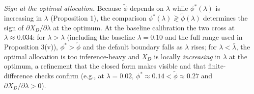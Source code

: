 \documentclass[
  11pt,
  letterpaper,
]{scrartcl}
\begin{document}
\emph{Sign at the optimal allocation.} Because \(\tilde{\phi}\) depends
on \(\lambda\) while \(\phi^*(\lambda)\) is increasing in \(\lambda\)
(Proposition 1), the comparison
\(\phi^*(\lambda) \gtrless \tilde{\phi}(\lambda)\) determines the sign
of \(\partial X_D/\partial \lambda\) at the optimum. At the baseline
calibration the two cross at \(\bar{\lambda} \approx 0.034\): for
\(\lambda > \bar{\lambda}\) (including the baseline \(\lambda = 0.10\)
and the full range used in Proposition 3(v)), \(\phi^* > \tilde{\phi}\)
and the default boundary falls as \(\lambda\) rises; for
\(\lambda < \bar{\lambda}\), the optimal allocation is too
inference-heavy and \(X_D\) is locally \emph{increasing} in \(\lambda\)
at the optimum, a refinement that the closed form makes visible and that
finite-difference checks confirm (e.g., at \(\lambda = 0.02\),
\(\phi^* \approx 0.14 < \tilde{\phi} \approx 0.27\) and
\(\partial X_D/\partial\lambda > 0\)).
\end{document}
